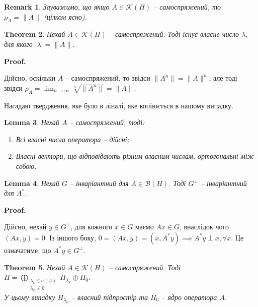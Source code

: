 \documentclass[a4paper, 10pt]{article}
\makeatletter
\theoremstyle{theoremdd}
\newtheorem{theorem}{Theorem}[subsection]
\theoremstyle{theoremdd}
\theoremstyle{theoremdd}
\theoremstyle{theoremdd}
\theoremstyle{theoremdd}
\theoremstyle{theoremdd}
\newtheorem{remark}[theorem]{Remark}
\theoremstyle{theoremdd}
\newtheorem{lemma}[theorem]{Lemma}
\theoremstyle{theoremdd}
\renewenvironment{proof}[1][Proof.\\]{\par
\pushQED{\hfill \qed}%
\normalfont \topsep6\p@\@plus6\p@\relax
\trivlist
\item\relax
{\bfseries
#1\@addpunct{.}}\hspace\labelsep\ignorespaces
}{%
\popQED\endtrivlist\@endpefalse
}
\makeatother
\begin{document}
\begin{remark}
Зауважимо, що якщо $A \in \mathcal{K}(H)$ -- самоспряжений, то $\rho_A = \|A\|$ (цілком ясно).
\end{remark}

\begin{theorem}
Нехай $A \in \mathcal{K}(H)$ -- самоспряжений. Тоді існує власне число $\lambda$, для якого $|\lambda| = \|A\|$.
\end{theorem}

\begin{proof}
Дійсно, оскільки $A$ -- самоспряжений, то звідси $\|A^n\| = \|A\|^n$, але тоді звідси $\rho_A = \displaystyle\lim_{n \to \infty} \sqrt[n]{\|A^n\|} = \|A\|$.
\end{proof}

Нагадаю твердження, яке було в ліналі, яке копіюється в нашому випадку.
\begin{lemma}
Нехай $A$ -- самоспряжений, тоді:
\begin{enumerate}[nosep,wide=0pt,label={\arabic*)}]
\item Всі власні числа оператора -- дійсні;
\item Власні вектори, що відповідають різним власним числам, ортогональні між собою.
\end{enumerate}
\end{lemma}

\begin{lemma}
Нехай $G$ -- інваріантний для $A \in \mathcal{B}(H)$. Тоді $G^\perp$ -- інваріантний для $A^*$.
\end{lemma}

\begin{proof}
Дійсно, нехай $y \in G^\perp$, для кожного $x \in G$ маємо $Ax \in G$, внаслідок чого $(Ax,y) = 0$. Із іншого боку, $0 = (Ax,y) = (x, A^*y) \implies A^*y \perp x, \forall x$. Це означатиме, що $A^*y \in G^\perp$.
\end{proof}

\begin{theorem}
Нехай $A \in \mathcal{K}(H)$ -- самоспряжений. Тоді $H = \displaystyle\bigoplus_{\substack{\lambda_k \in \sigma(A) \\ \lambda_k \ne 0 }} H_{\lambda_k} \oplus H_0$.\\
У цьому випадку $H_{\lambda_k}$ -- власний підпростір та $H_0$ -- ядро оператора $A$.
\end{theorem}
\end{document}
